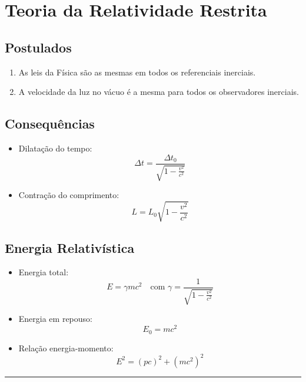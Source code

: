 \documentclass[a4paper,12pt]{article}
\begin{document}
\section*{Teoria da Relatividade Restrita}
\subsection*{Postulados}
\begin{enumerate}
    \item As leis da Física são as mesmas em todos os referenciais inerciais.
    \item A velocidade da luz no vácuo é a mesma para todos os observadores inerciais.
\end{enumerate}

\subsection*{Consequências}
\begin{itemize}
    \item Dilatação do tempo:
    \[
        \Delta t = \frac{\Delta t_0}{\sqrt{1 - \frac{v^2}{c^2}}}
    \]
    \item Contração do comprimento:
    \[
        L = L_0 \sqrt{1 - \frac{v^2}{c^2}}
    \]
\end{itemize}

\subsection*{Energia Relativística}
\begin{itemize}
    \item Energia total:
    \[
        E = \gamma m c^2
    \quad \text{com } \gamma = \frac{1}{\sqrt{1 - \frac{v^2}{c^2}}}
    \]
    \item Energia em repouso:
    \[
        E_0 = m c^2
    \]
    \item Relação energia-momento:
    \[
        E^2 = (pc)^2 + (m c^2)^2
    \]
\end{itemize}
\noindent\rule{\linewidth}{0.6pt}\\
\end{document}
